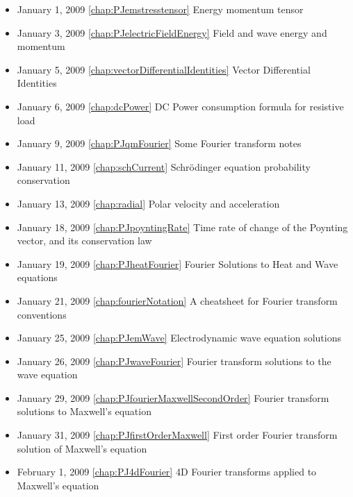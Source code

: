 \begin{itemize}
\item January 1, 2009 \ref{chap:PJemstresstensor} Energy momentum tensor

\item January 3, 2009 \ref{chap:PJelectricFieldEnergy} Field and wave energy and momentum

\item January 5, 2009 \ref{chap:vectorDifferentialIdentities} Vector Differential Identities

\item January 6, 2009 \ref{chap:dcPower} DC Power consumption formula for resistive load

\item January 9, 2009 \ref{chap:PJqmFourier} Some Fourier transform notes

\item January 11, 2009 \ref{chap:schCurrent} Schr\"{o}dinger equation probability conservation

\item January 13, 2009 \ref{chap:radial} Polar velocity and acceleration

\item January 18, 2009 \ref{chap:PJpoyntingRate} Time rate of change of the Poynting vector, and its conservation law

\item January 19, 2009 \ref{chap:PJheatFourier} Fourier Solutions to Heat and Wave equations

\item January 21, 2009 \ref{chap:fourierNotation} A cheatsheet for Fourier transform conventions

\item January 25, 2009 \ref{chap:PJemWave} Electrodynamic wave equation solutions

\item January 26, 2009 \ref{chap:PJwaveFourier} Fourier transform solutions to the wave equation

\item January 29, 2009 \ref{chap:PJfourierMaxwellSecondOrder} Fourier transform solutions to Maxwell's equation

\item January 31, 2009 \ref{chap:PJfirstOrderMaxwell} First order Fourier transform solution of Maxwell's equation

\item February 1, 2009 \ref{chap:PJ4dFourier} 4D Fourier transforms applied to Maxwell's equation


\end{itemize}
